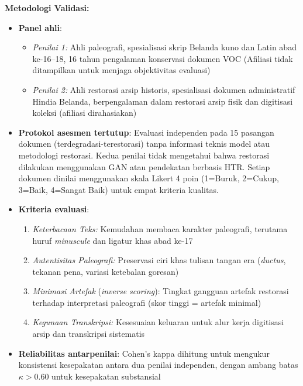 \documentclass[12pt,a4paper]{article}
\begin{document}
\textbf{Metodologi Validasi:}
\begin{itemize}[nosep]
    \item \textbf{Panel ahli}: 
    \begin{itemize}
        \item[$-$] \textit{Penilai 1:} Ahli paleografi, spesialisasi skrip Belanda kuno dan Latin abad ke-16--18, 16 tahun pengalaman konservasi dokumen VOC (Afiliasi tidak ditampilkan untuk menjaga objektivitas evaluasi)
        \item[$-$] \textit{Penilai 2:} Ahli restorasi arsip historis, spesialisasi dokumen administratif Hindia Belanda, berpengalaman dalam restorasi arsip fisik dan digitisasi koleksi (afiliasi dirahasiakan)
    \end{itemize}
    \item \textbf{Protokol asesmen tertutup}: Evaluasi independen pada 15 pasangan dokumen (terdegradasi-terestorasi) tanpa informasi teknis model atau metodologi restorasi. Kedua penilai tidak mengetahui bahwa restorasi dilakukan menggunakan GAN atau pendekatan berbasis HTR. Setiap dokumen dinilai menggunakan skala Likert 4 poin (1=Buruk, 2=Cukup, 3=Baik, 4=Sangat Baik) untuk empat kriteria kualitas.
    \item \textbf{Kriteria evaluasi}:
    \begin{enumerate}[nosep]
        \item \textit{Keterbacaan Teks:} Kemudahan membaca karakter paleografi, terutama huruf \textit{minuscule} dan ligatur khas abad ke-17
        \item \textit{Autentisitas Paleografi:} Preservasi ciri khas tulisan tangan era (\textit{ductus}, tekanan pena, variasi ketebalan goresan)
        \item \textit{Minimasi Artefak} (\textit{inverse scoring}): Tingkat gangguan artefak restorasi terhadap interpretasi paleografi (skor tinggi = artefak minimal)
        \item \textit{Kegunaan Transkripsi:} Kesesuaian keluaran untuk alur kerja digitisasi arsip dan transkripsi sistematis
    \end{enumerate}
    \item \textbf{Reliabilitas antarpenilai}: Cohen's kappa dihitung untuk mengukur konsistensi kesepakatan antara dua penilai independen, dengan ambang batas $\kappa > 0.60$ untuk kesepakatan substansial
\end{itemize}
\end{document}
